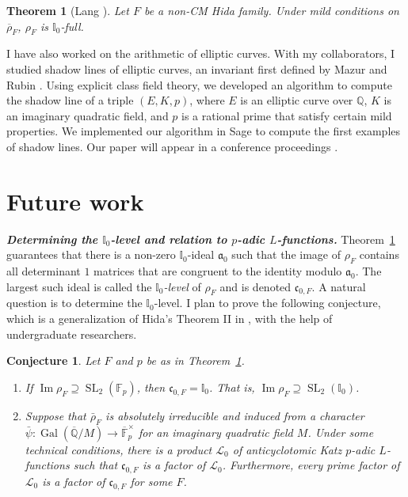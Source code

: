 \documentclass[12pt]{article}
\newcommand{\Aa}{\mathfrak{a}}
\newcommand{\cc}{\mathfrak{c}}
\newcommand{\F}{\mathbb{F}}
\newcommand{\I}{\mathbb{I}}
\newcommand{\aL}{\mathcal{L}}
\newcommand{\Q}{\mathbb{Q}}
\newtheorem{conj}{Conjecture}
\newtheorem{theorem}{Theorem}
\theoremstyle{definition}
\DeclareMathOperator{\Gal}{Gal}
\DeclareMathOperator{\im}{Im}
\DeclareMathOperator{\SL}{SL}
\begin{document}
\begin{theorem}[Lang \cite{Lang15}]\label{thesis}
Let $F$ be a non-CM Hida family.  Under mild conditions on $\overline{\rho}_F$, $\rho_F$ is $\I_0$-full.
\end{theorem}

I have also worked on the arithmetic of elliptic curves.  With my collaborators, I studied shadow lines of elliptic curves, an invariant first defined by Mazur and Rubin \cite{MazurRubin03}.  Using explicit class field theory, we developed an algorithm to compute the shadow line of a triple $(E, K, p)$, where $E$ is an elliptic curve over $\Q$, $K$ is an imaginary quadratic field, and $p$ is a rational prime that satisfy certain mild properties.  We implemented our algorithm in Sage \cite{SAGE} to compute the first examples of shadow lines.  Our paper will appear in a conference proceedings \cite{BCLMN15}.  

\section*{Future work}
\textit{\textbf{Determining the $\I_0$-level and relation to $p$-adic $L$-functions.}}  Theorem~\ref{thesis} guarantees that there is a non-zero $\I_0$-ideal $\Aa_0$ such that the image of $\rho_F$ contains all determinant $1$ matrices that are congruent to the identity modulo $\Aa_0$.  The largest such ideal is called the \textit{$\I_0$-level} of $\rho_F$ and is denoted $\cc_{0,F}$.  A natural question is to determine the $\I_0$-level.  I plan to prove the following conjecture, which is a generalization of Hida's Theorem II in \cite{Hida15}, with the help of undergraduate researchers.

\begin{conj}\label{level}
Let $F$ and $p$ be as in Theorem~\ref{thesis}.  
\begin{enumerate}
\item\label{full} If $\im \rho_F \supseteq \SL_2(\F_p)$, then $\cc_{0,F} = \I_0$.  That is, $\im \rho_F \supseteq \SL_2(\I_0)$.
\item\label{Katz} Suppose that $\bar{\rho}_F$ is absolutely irreducible and induced from a character $\bar{\psi} : \Gal(\overline{\Q}/M) \to \overline{\F}_p^\times$ for an imaginary quadratic field $M$.  Under some technical conditions, there is a product $\aL_0$ of anticyclotomic Katz $p$-adic $L$-functions such that $\cc_{0, F}$ is a factor of $\aL_0$.  Furthermore, every prime factor of $\aL_0$ is a factor of $\cc_{0, F}$ for some $F$.  
\end{enumerate}
\end{conj}
\end{document}
